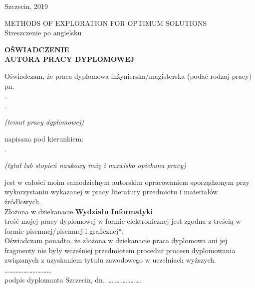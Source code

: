 \documentclass[12pt,a4paper]{report}
\begin{document}
\vspace{2cm}
\begin{center}
Szczecin, 2019    
\end{center}
\newpage
METHODS OF EXPLORATION FOR OPTIMUM SOLUTIONS\\[2cm]
Streszczenie po angielsku
\newpage
\vspace*{3cm}
\begin{center}
\textbf{\large{OŚWIADCZENIE\\AUTORA PRACY DYPLOMOWEJ}}    
\end{center}
Oświadczam, że praca dyplomowa inżynierska/magisterska (podać rodzaj pracy) pn.\\
.\dotfill\\
.\dotfill\\
\vspace{-1cm}
\begin{center}
    \small{\textsl{(temat pracy dyplomowej)}}\\
\end{center}
\vspace{-0.5cm}
napisana pod kierunkiem:\\[0.2cm]
.\dotfill\\
\vspace{-1cm}
\begin{center}
    \small{\textsl{(tytuł lub stopień naukowy imię i nazwisko opiekuna pracy)}}
\end{center}
jest w całości moim samodzielnym autorskim opracowaniem sporządzonym przy wykorzystaniu wykazanej w pracy literatury przedmiotu i materiałów źródłowych.\\
Złożona w dziekanacie \textbf{{\large}Wydziału Informatyki}\\[0.5cm]
treść  mojej pracy dyplomowej w formie elektronicznej jest zgodna z treścią w formie pisemnej/pisemnej i graficznej*.\\[0.5cm]
Oświadczam ponadto, że złożona w dziekanacie praca dyplomowa ani jej fragmenty nie były wcześniej przedmiotem procedur procesu dyplomowania związanych z uzyskaniem tytułu zawodowego w uczelniach wyższych.\\[1cm]
\hspace*{11cm}…………………………\\
\hspace*{12cm}podpis dyplomanta
\vspace{1cm}
Szczecin, dn. ………………….
\end{document}
